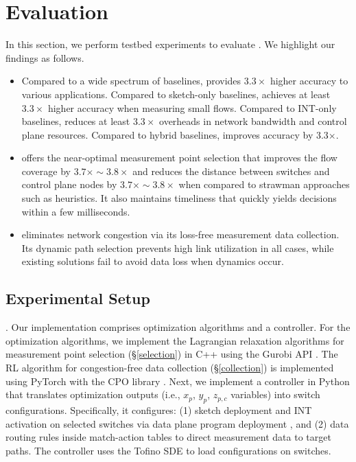\section{Evaluation}\label{eval}

In this section, we perform testbed experiments to evaluate \sysname. We highlight our findings as follows.

\begin{itemize}[leftmargin=*]
%
    \item Compared to a wide spectrum of baselines, \sysname provides $3.3\times$ higher accuracy to various applications. Compared to sketch-only baselines, \sysname achieves at least $3.3\times$ higher accuracy when measuring small flows. Compared to INT-only baselines, \sysname reduces at least $3.3\times$ overheads in network bandwidth and control plane resources. Compared to hybrid baselines, \sysname improves accuracy by 3.3$\times$. 
%
    \item \sysname offers the near-optimal measurement point selection that improves the flow coverage by $3.7\times \sim 3.8\times$ and reduces the distance between switches and control plane nodes by $3.7\times \sim 3.8\times$ when compared to strawman approaches such as heuristics. It also maintains timeliness that quickly yields decisions within a few milliseconds. 
%
    \item \sysname eliminates network congestion via its loss-free measurement data collection. Its dynamic path selection prevents high link utilization in all cases, while existing solutions fail to avoid data loss when dynamics occur. 
%
\end{itemize}

\subsection{Experimental Setup}\label{setup}

. Our implementation comprises optimization algorithms and a controller. For the optimization algorithms, we implement the Lagrangian relaxation algorithms for measurement point selection (\S\ref{selection}) in C++ using the Gurobi API \cite{gurobi}. The RL algorithm for congestion-free data collection (\S\ref{collection}) is implemented using PyTorch with the CPO library \cite{pytorch}. Next, we implement a controller in Python that translates optimization outputs (i.e., \(x_p\), \(y_p\), \(z_{p,c}\) variables) into switch configurations. Specifically, it configures: (1) sketch deployment and INT activation on selected switches via data plane program deployment \cite{chen2020speed,gao2020lyra}, and (2) data routing rules inside match-action tables to direct measurement data to target paths. The controller uses the Tofino SDE \cite{tofino2} to load configurations on switches.

